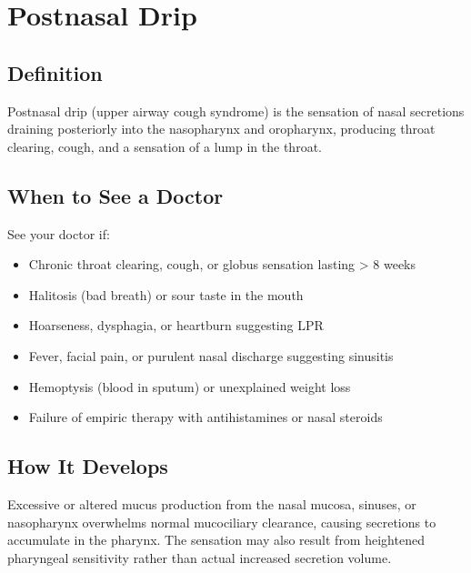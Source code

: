 \chapter{Postnasal Drip}

\section*{Definition}
Postnasal drip (upper airway cough syndrome) is the sensation of nasal secretions draining posteriorly into the nasopharynx and oropharynx, producing throat clearing, cough, and a sensation of a lump in the throat.

\section*{When to See a Doctor}
See your doctor if:
\begin{itemize}
  \item Chronic throat clearing, cough, or globus sensation lasting > 8 weeks
  \item Halitosis (bad breath) or sour taste in the mouth
  \item Hoarseness, dysphagia, or heartburn suggesting LPR
  \item Fever, facial pain, or purulent nasal discharge suggesting sinusitis
  \item Hemoptysis (blood in sputum) or unexplained weight loss
  \item Failure of empiric therapy with antihistamines or nasal steroids
\end{itemize}

\section*{How It Develops}
Excessive or altered mucus production from the nasal mucosa, sinuses, or nasopharynx overwhelms normal mucociliary clearance, causing secretions to accumulate in the pharynx. The sensation may also result from heightened pharyngeal sensitivity rather than actual increased secretion volume.

